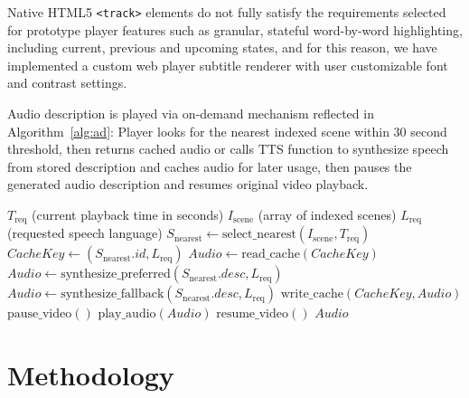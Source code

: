 ﻿\documentclass[conference]{IEEEtran}
\begin{document}
Native HTML5 \texttt{<track>} elements do not fully satisfy the requirements selected for prototype player features such as granular, stateful word-by-word highlighting, including current, previous and upcoming states, and for this reason, we have implemented a custom web player subtitle renderer with user customizable font and contrast settings.

Audio description is played via on-demand mechanism reflected in Algorithm~\ref{alg:ad}: Player looks for the nearest indexed scene within 30 second threshold, then returns cached audio or calls TTS function to synthesize speech from stored description and caches audio for later usage, then pauses the generated audio description and resumes original video playback.

\begin{algorithm}[!t]
\caption{On-Demand Audio Description Resolution}
\label{alg:ad}
\begin{algorithmic}[1]
\Require $T_{\text{req}}$ (current playback time in seconds)
\Require $I_{\text{scene}}$ (array of indexed scenes)
\Require $L_{\text{req}}$ (requested speech language)
\State $S_{\text{nearest}} \gets \text{select\_nearest}(I_{\text{scene}}, T_{\text{req}})$
    \State \Return {}
\EndIf
\State $CacheKey \gets (S_{\text{nearest}}.id, L_{\text{req}})$
    \State $Audio \gets \text{read\_cache}(CacheKey)$
\Else
        \State $Audio \gets \text{synthesize\_preferred}(S_{\text{nearest}}.desc, L_{\text{req}})$
    \Else
        \State $Audio \gets \text{synthesize\_fallback}(S_{\text{nearest}}.desc, L_{\text{req}})$
    \EndIf
    \State $\text{write\_cache}(CacheKey, Audio)$
\EndIf
\State $\text{pause\_video}()$
\State $\text{play\_audio}(Audio)$
\State $\text{resume\_video}()$
\State \Return $Audio$
\end{algorithmic}
\end{algorithm}

\section{Methodology}
\end{document}
